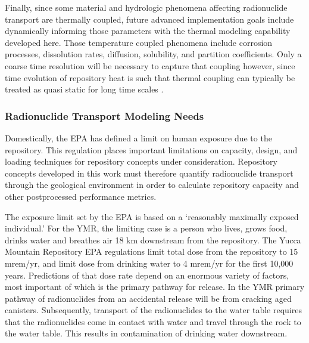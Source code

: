 Finally, since some material and hydrologic phenomena affecting radionuclide 
transport are thermally coupled, future advanced implementation goals include 
dynamically informing those parameters with the thermal modeling capability 
developed here.  Those temperature coupled phenomena include corrosion 
processes, dissolution rates, diffusion, solubility, and partition 
coefficients.  Only a coarse time resolution will be necessary to capture that 
coupling however, since time evolution of repository heat is such that thermal 
coupling can typically be treated as quasi static for long time scales 
\cite{andra_argile:_2005}. 




\subsubsection{Radionuclide Transport Modeling Needs}

Domestically, the \gls{EPA} has defined a limit on  human 
exposure due to the repository. This regulation places important limitations on 
capacity, design, and loading techniques for repository concepts under 
consideration. Repository concepts developed in this work must therefore 
quantify radionuclide transport through the geological environment in order to 
calculate repository capacity and other postprocessed performance metrics. 

The exposure limit set by the \gls{EPA} is based on a `reasonably maximally 
exposed individual.' For the \gls{YMR}, the limiting case is a person who lives, 
grows food, drinks water and breathes air 18 km downstream from the repository. 
The Yucca Mountain Repository \gls{EPA} regulations limit total dose from the 
repository to 15 mrem/yr, and limit dose from drinking water to 4 mrem/yr for 
the first 10,000 years. 
Predictions of that dose rate depend on an enormous variety of factors, most 
important of which is the primary pathway for release. In the \gls{YMR} primary 
pathway of radionuclides from an accidental release will be from cracking aged 
canisters. Subsequently, transport of the radionuclides to the water table 
requires that the radionuclides come in contact with water and travel through 
the rock to the water table. This results in contamination of drinking water 
downstream.  

